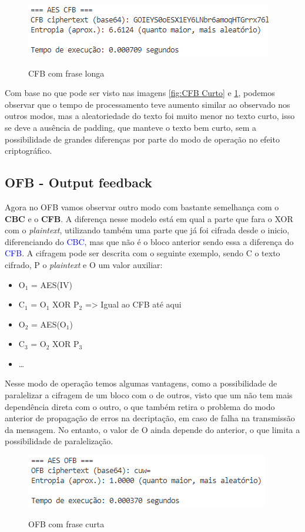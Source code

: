 \documentclass[12pt]{article}
\newcommand{\blue}[1]{\textcolor{blue}{#1}}
\begin{document}
\begin{figure}[h]
    \caption{CFB com frase longa}
    \centering
    \includegraphics[width = 0.5\linewidth]{Imagens/CFB-longo.png}  
    \label{fig:CFB Longo}
\end{figure}

Com base no que pode ser visto nas imagens \ref{fig:CFB Curto} e \ref{fig:CFB Longo}, podemos observar que o tempo de processamento teve aumento similar ao observado nos outros modos, mas a aleatoriedade do texto foi muito menor no texto curto, isso se deve a ausência de padding, que manteve o texto bem curto, sem a possibilidade de grandes diferenças por parte do modo de operação no efeito criptográfico.

\subsection{OFB - Output feedback}
Agora no OFB vamos observar outro modo com bastante semelhança com o \textbf{CBC} e o \textbf{CFB}. A diferença nesse modelo está em qual a parte que fara o XOR com o \textit{plaintext}, utilizando também uma parte que já foi cifrada desde o inicio, diferenciando do \blue{CBC}, mas que não é o bloco anterior sendo essa a diferença do \blue{CFB}. A cifragem pode ser descrita com o seguinte exemplo, sendo C o texto cifrado, P o \textit{plaintext} e O um valor auxiliar:
\begin{itemize}
  \item O$_{1}$ = AES(IV)
  \item C$_{1}$ = O$_{1}$ XOR P$_{2}$ => Igual ao CFB até aqui
  \item O$_{2}$ = AES(O$_{1}$)
  \item C$_{3}$ = O$_{2}$ XOR P$_{3}$
  \item \dots
\end{itemize}

Nesse modo de operação temos algumas vantagens, como a possibilidade de paralelizar a cifragem de um bloco com o de outros, visto que um não tem mais dependência direta com o outro, o que também retira o problema do modo anterior de propagação de erros na decriptação, em caso de falha na transmissão da mensagem. No entanto, o valor de O ainda depende do anterior, o que limita a possibilidade de paralelização. 

\begin{figure}[h]
    \caption{OFB com frase curta}
    \centering
    \includegraphics[width = 0.5\linewidth]{Imagens/OFB-curto.png}  
    \label{fig:OFB Curto}
\end{figure}
\end{document}

